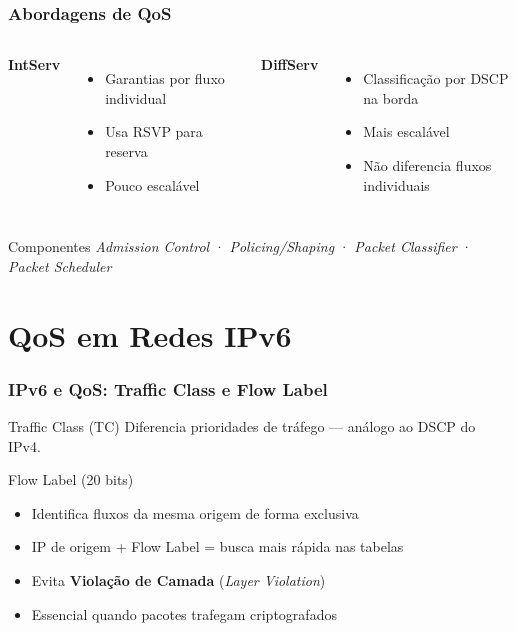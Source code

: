\documentclass{beamer}
\begin{document}
  \begin{frame}
    \frametitle{Abordagens de QoS}
    \begin{columns}
      \textbf{IntServ}
      \begin{itemize}
        \item Garantias por fluxo individual
        \item Usa RSVP para reserva
        \item Pouco escalável
      \end{itemize}
      \textbf{DiffServ}
      \begin{itemize}
        \item Classificação por DSCP na borda
        \item Mais escalável
        \item Não diferencia fluxos individuais
      \end{itemize}
    \end{columns}
    \vspace{0.8em}
    \begin{block}{Componentes}
      \textit{Admission Control} · \textit{Policing/Shaping} ·
      \textit{Packet Classifier} · \textit{Packet Scheduler}
    \end{block}
  \end{frame}

  \section{QoS em Redes IPv6}

  \begin{frame}
    \frametitle{IPv6 e QoS: Traffic Class e Flow Label}
    \begin{block}{Traffic Class (TC)}
      Diferencia prioridades de tráfego — análogo ao DSCP do IPv4.
    \end{block}
    \vspace{0.5em}
    \begin{block}{Flow Label (20 bits)}
      \begin{itemize}
        \item<2-> Identifica fluxos da mesma origem de forma exclusiva
        \item<3-> IP de origem + Flow Label = busca mais rápida nas tabelas
        \item<4-> Evita \textbf{Violação de Camada} (\textit{Layer Violation})
        \item<5-> Essencial quando pacotes trafegam criptografados
      \end{itemize}
    \end{block}
  \end{frame}
\end{document}
